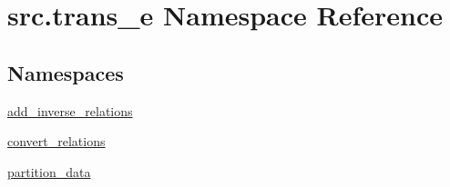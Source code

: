 \hypertarget{namespacesrc_1_1trans__e}{}\section{src.\+trans\+\_\+e Namespace Reference}
\label{namespacesrc_1_1trans__e}
\subsection*{Namespaces}
\begin{DoxyCompactItemize}
\item 
 \hyperlink{namespacesrc_1_1trans__e_1_1add__inverse__relations}{add\+\_\+inverse\+\_\+relations}
\item 
 \hyperlink{namespacesrc_1_1trans__e_1_1convert__relations}{convert\+\_\+relations}
\item 
 \hyperlink{namespacesrc_1_1trans__e_1_1partition__data}{partition\+\_\+data}
\end{DoxyCompactItemize}
